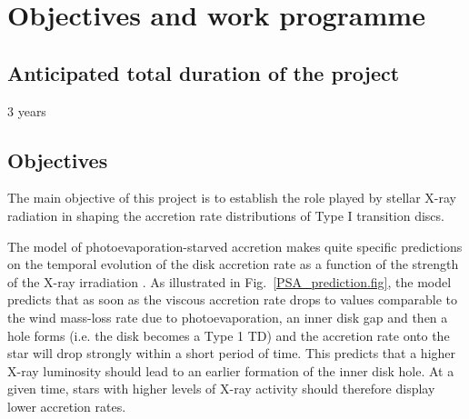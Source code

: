 \documentclass[10pt,fleqn,twoside]{article}
\begin{document}



\section{Objectives and work programme}
\renewcommand{\leftmark}{\sc Objectives and work programme}


\subsection{Anticipated total duration of the project}

3 years

\subsection{Objectives}

\begin{highlight}
The main objective of this project is to establish the role played by
stellar X-ray radiation in shaping the accretion rate distributions of
Type I transition discs.
\end{highlight}
%
The model of photoevaporation-starved accretion makes quite specific
predictions on the temporal evolution of the disk accretion rate
as a function of the strength of the X-ray irradiation \citep{Drake09,Owen11}.
As illustrated in Fig.~\ref{PSA_prediction.fig}, the model predicts that
as soon as the viscous accretion rate drops to values comparable to
the wind mass-loss rate due to photoevaporation, an inner disk gap and
then a hole forms
 (i.e. the disk becomes a Type 1 TD) and the accretion rate onto the star will drop strongly within a short period
of time.
This predicts that a higher X-ray luminosity should lead to
an earlier formation of the inner disk hole. At a given time, 
stars with higher levels of X-ray activity should therefore display
lower accretion rates.
\end{document}
